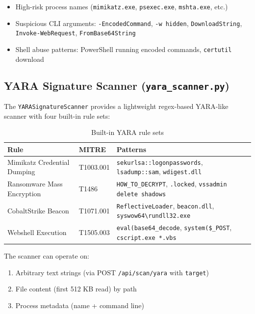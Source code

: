\documentclass[12pt,a4paper]{article}
\begin{document}
\begin{itemize}[noitemsep]
    \item High-risk process names (\texttt{mimikatz.exe}, \texttt{psexec.exe}, \texttt{mshta.exe}, etc.)
    \item Suspicious CLI arguments: \texttt{-EncodedCommand}, \texttt{-w hidden},
          \texttt{DownloadString}, \texttt{Invoke-WebRequest}, \texttt{FromBase64String}
    \item Shell abuse patterns: PowerShell running encoded commands, \texttt{certutil} download
\end{itemize}

\subsection{YARA Signature Scanner (\texttt{yara\_scanner.py})}

The \texttt{YARASignatureScanner} provides a lightweight regex-based YARA-like
scanner with four built-in rule sets:

\begin{table}[H]
\centering
\begin{tabularx}{\linewidth}{llX}
\toprule
\textbf{Rule} & \textbf{MITRE} & \textbf{Patterns} \\
\midrule
Mimikatz Credential Dumping & T1003.001 & \texttt{sekurlsa::logonpasswords}, \texttt{lsadump::sam}, \texttt{wdigest.dll} \\
Ransomware Mass Encryption & T1486 & \texttt{HOW\_TO\_DECRYPT}, \texttt{.locked}, \texttt{vssadmin delete shadows} \\
CobaltStrike Beacon & T1071.001 & \texttt{ReflectiveLoader}, \texttt{beacon.dll}, \texttt{syswow64\textbackslash{}rundll32.exe} \\
Webshell Execution & T1505.003 & \texttt{eval(base64\_decode}, \texttt{system(\$\_POST}, \texttt{cscript.exe *.vbs} \\
\bottomrule
\end{tabularx}
\caption{Built-in YARA rule sets}
\end{table}

The scanner can operate on:
\begin{enumerate}[noitemsep]
    \item Arbitrary text strings (via POST \texttt{/api/scan/yara} with \texttt{target})
    \item File content (first 512 KB read) by path
    \item Process metadata (name + command line)
\end{enumerate}
\end{document}
